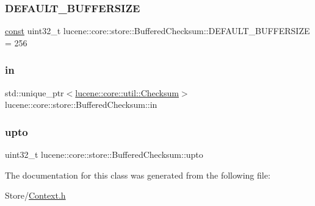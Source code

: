 \subsubsection{\texorpdfstring{D\+E\+F\+A\+U\+L\+T\+\_\+\+B\+U\+F\+F\+E\+R\+S\+I\+ZE}{DEFAULT\_BUFFERSIZE}}
{\footnotesize\ttfamily \mbox{\hyperlink{ZlibCrc32_8h_a2c212835823e3c54a8ab6d95c652660e}{const}} uint32\+\_\+t lucene\+::core\+::store\+::\+Buffered\+Checksum\+::\+D\+E\+F\+A\+U\+L\+T\+\_\+\+B\+U\+F\+F\+E\+R\+S\+I\+ZE = 256}

\mbox{\label{classlucene_1_1core_1_1store_1_1BufferedChecksum_a5c92d0cdf327fef20d149b87770f8b3b}} 
\subsubsection{\texorpdfstring{in}{in}}
{\footnotesize\ttfamily std\+::unique\+\_\+ptr$<$\mbox{\hyperlink{classlucene_1_1core_1_1util_1_1Checksum}{lucene\+::core\+::util\+::\+Checksum}}$>$ lucene\+::core\+::store\+::\+Buffered\+Checksum\+::in\hspace{0.3cm}{\ttfamily [private]}}

\mbox{\label{classlucene_1_1core_1_1store_1_1BufferedChecksum_abe5f8d87f42a6987ea28d175aa653e74}} 
\subsubsection{\texorpdfstring{upto}{upto}}
{\footnotesize\ttfamily uint32\+\_\+t lucene\+::core\+::store\+::\+Buffered\+Checksum\+::upto\hspace{0.3cm}{\ttfamily [private]}}



The documentation for this class was generated from the following file\+:\begin{DoxyCompactItemize}
\item 
Store/\mbox{\hyperlink{Context_8h}{Context.\+h}}\end{DoxyCompactItemize}

